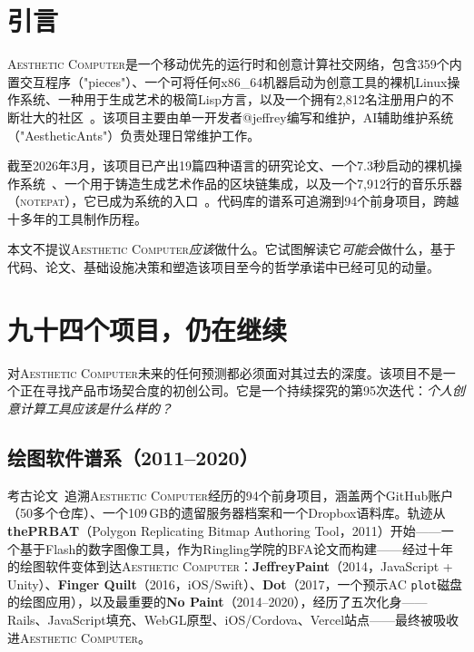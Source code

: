 \documentclass[10pt,letterpaper,twocolumn]{article}
\newcommand{\ac}{\textsc{Aesthetic Computer}}
\newcommand{\np}{\textsc{notepat}}
\begin{document}

\section{引言}

\ac{}是一个移动优先的运行时和创意计算社交网络，包含359个内置交互程序（"pieces"）、一个可将任何x86\_64机器启动为创意工具的裸机Linux操作系统、一种用于生成艺术的极简Lisp方言，以及一个拥有2,812名注册用户的不断壮大的社区~\citep{scudder2026ac}。该项目主要由单一开发者@jeffrey编写和维护，AI辅助维护系统（"AestheticAnts"）负责处理日常维护工作。

截至2026年3月，该项目已产出19篇四种语言的研究论文、一个7.3秒启动的裸机操作系统~\citep{scudder2026os}、一个用于铸造生成艺术作品的区块链集成，以及一个7,912行的音乐乐器（\np{}），它已成为系统的入口~\citep{scudder2026notepat}。代码库的谱系可追溯到94个前身项目，跨越十多年的工具制作历程。

本文不提议\ac{}\emph{应该}做什么。它试图解读它\emph{可能会}做什么，基于代码、论文、基础设施决策和塑造该项目至今的哲学承诺中已经可见的动量。


\section{九十四个项目，仍在继续}
\label{sec:history}

对\ac{}未来的任何预测都必须面对其过去的深度。该项目不是一个正在寻找产品市场契合度的初创公司。它是一个持续探究的第95次迭代：\emph{个人创意计算工具应该是什么样的？}

\subsection{绘图软件谱系（2011--2020）}

考古论文~\citep{scudder2026archaeology}追溯\ac{}经历的94个前身项目，涵盖两个GitHub账户（50多个仓库）、一个109\,GB的遗留服务器档案和一个Dropbox语料库。轨迹从\textbf{thePRBAT}（Polygon Replicating Bitmap Authoring Tool，2011）开始——一个基于Flash的数字图像工具，作为Ringling学院的BFA论文而构建——经过十年的绘图软件变体到达\ac{}：\textbf{JeffreyPaint}（2014，JavaScript + Unity）、\textbf{Finger Quilt}（2016，iOS/Swift）、\textbf{Dot}（2017，一个预示AC \texttt{plot}磁盘的绘图应用），以及最重要的\textbf{No Paint}（2014--2020），经历了五次化身——Rails、JavaScript填充、WebGL原型、iOS/Cordova、Vercel站点——最终被吸收进\ac{}。
\end{document}
